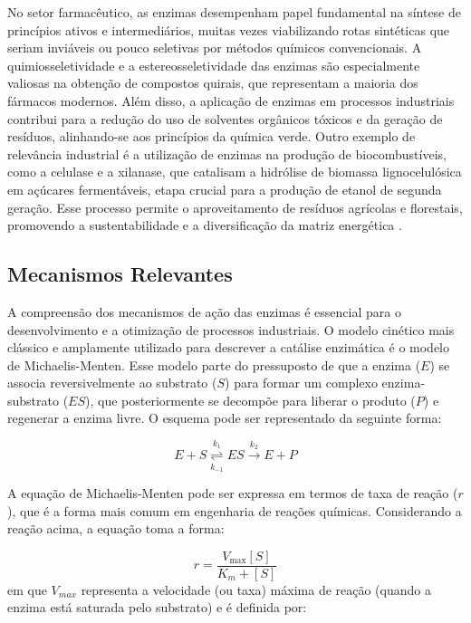 \documentclass[12pt,oneside]{report}
\begin{document}
No setor farmacêutico, as enzimas desempenham papel fundamental na síntese de princípios ativos e intermediários, muitas vezes viabilizando rotas sintéticas que seriam inviáveis ou pouco seletivas por métodos químicos convencionais. A quimiosseletividade e a estereosseletividade das enzimas são especialmente valiosas na obtenção de compostos quirais, que representam a maioria dos fármacos modernos. Além disso, a aplicação de enzimas em processos industriais contribui para a redução do uso de solventes orgânicos tóxicos e da geração de resíduos, alinhando-se aos princípios da química verde. Outro exemplo de relevância industrial é a utilização de enzimas na produção de biocombustíveis, como a celulase e a xilanase, que catalisam a hidrólise de biomassa lignocelulósica em açúcares fermentáveis, etapa crucial para a produção de etanol de segunda geração. Esse processo permite o aproveitamento de resíduos agrícolas e florestais, promovendo a sustentabilidade e a diversificação da matriz energética \cite{patel2007biocatalysis}.

\subsection{Mecanismos Relevantes}

A compreensão dos mecanismos de ação das enzimas é essencial para o desenvolvimento e a otimização de processos industriais. O modelo cinético mais clássico e amplamente utilizado para descrever a catálise enzimática é o modelo de Michaelis-Menten. Esse modelo parte do pressuposto de que a enzima ($E$) se associa reversivelmente ao substrato ($S$) para formar um complexo enzima-substrato ($ES$), que posteriormente se decompõe para liberar o produto ($P$) e regenerar a enzima livre. O esquema pode ser representado da seguinte forma:

\begin{equation}
    E + S \overset{k_1}{\underset{k_{-1}}{\rightleftharpoons}} ES \xrightarrow{k_2} E + P
\end{equation}

A equação de Michaelis-Menten pode ser expressa em termos de taxa de reação ($r$), que é a forma mais comum em engenharia de reações químicas. Considerando a reação acima, a equação toma a forma:

\begin{equation}
    r = \frac{V_{\text{max}} [S]}{K_m + [S]}
\end{equation}
em que $V_{max}$ representa a velocidade (ou taxa) máxima de reação (quando a enzima está saturada pelo substrato) e é definida por:
\end{document}
